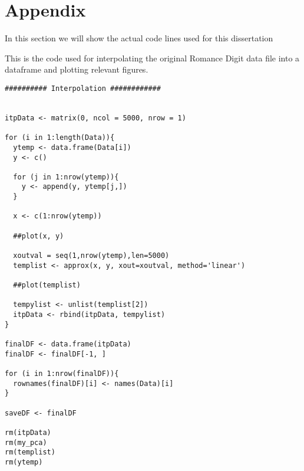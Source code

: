 \section*{Appendix}


In this section we will show the actual code lines used for this dissertation

This is the code used for interpolating the original Romance Digit data file into a dataframe and plotting relevant figures.
\begin{verbatim}
########## Interpolation ############


itpData <- matrix(0, ncol = 5000, nrow = 1)

for (i in 1:length(Data)){
  ytemp <- data.frame(Data[i])
  y <- c()
  
  for (j in 1:nrow(ytemp)){
    y <- append(y, ytemp[j,])
  }
  
  x <- c(1:nrow(ytemp))
  
  ##plot(x, y)
  
  xoutval = seq(1,nrow(ytemp),len=5000)
  templist <- approx(x, y, xout=xoutval, method='linear')
  
  ##plot(templist)
  
  tempylist <- unlist(templist[2])
  itpData <- rbind(itpData, tempylist)
}

finalDF <- data.frame(itpData)
finalDF <- finalDF[-1, ]

for (i in 1:nrow(finalDF)){
  rownames(finalDF)[i] <- names(Data)[i]
}

saveDF <- finalDF

rm(itpData)
rm(my_pca)
rm(templist)
rm(ytemp)
\end{verbatim}

